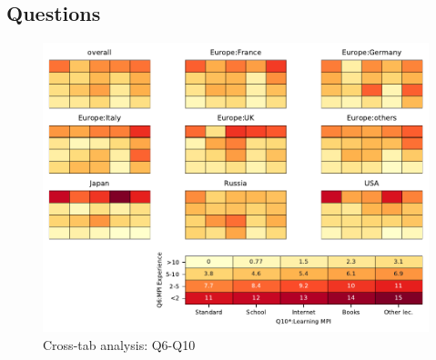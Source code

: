 
\subsection{Questions}


\begin{figure}
\begin{center}
\includegraphics[width=12cm]{../pdfs/Q6-Q10.pdf}
\caption{Cross-tab analysis: Q6-Q10}
\label{fig:Q6-Q10}
\end{center}
\end{figure}
